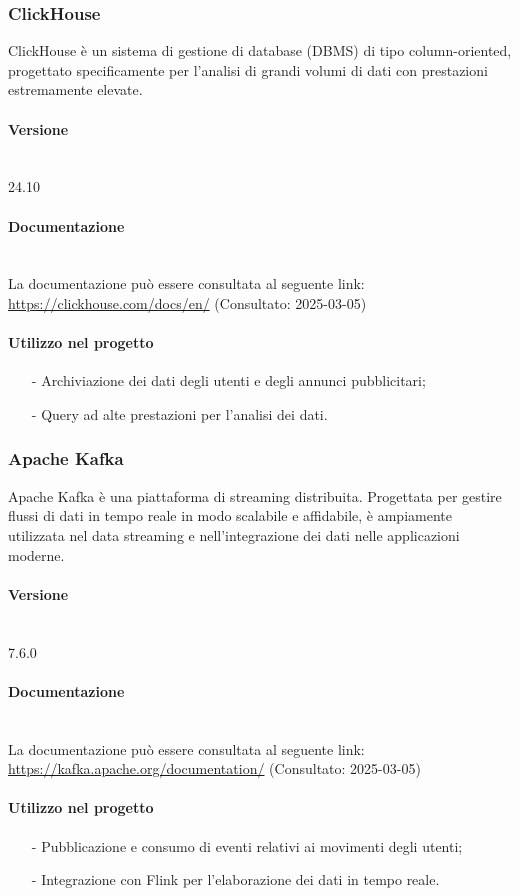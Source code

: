 \documentclass[10pt]{article}
\newcommand{\myparagraph}[1]{\paragraph{#1}\mbox{}\\\vspace{0.4em}}
\begin{document}
\begin{justify}
    \subsubsection{ClickHouse}
    ClickHouse è un sistema di gestione di database (DBMS) di tipo column-oriented, progettato specificamente per l'analisi di grandi volumi di dati con prestazioni estremamente elevate.

    \myparagraph{Versione} 
    24.10 %

    \myparagraph{Documentazione}
    La documentazione può essere consultata al seguente link: \textcolor{blue}{\url{https://clickhouse.com/docs/en/}} (Consultato: 2025-03-05)
    
    \paragraph{Utilizzo nel progetto}
    \begin{itemize}
        \item[-] Archiviazione dei dati degli utenti e degli annunci pubblicitari;
        \item[-] Query ad alte prestazioni per l'analisi dei dati.
    \end{itemize}

    \subsubsection{Apache Kafka}
    Apache Kafka è una piattaforma di streaming distribuita. Progettata per gestire flussi di dati in tempo reale in modo scalabile e affidabile, è ampiamente utilizzata nel data streaming e nell’integrazione dei dati nelle applicazioni moderne.
    
    \myparagraph{Versione} 
    7.6.0 
    
    \myparagraph{Documentazione} 
    La documentazione può essere consultata al seguente link: \textcolor{blue}{\url{https://kafka.apache.org/documentation/}} (Consultato: 2025-03-05)
    
    \paragraph{Utilizzo nel progetto}
    \begin{itemize}
        \item[-] Pubblicazione e consumo di eventi relativi ai movimenti degli utenti;
        \item[-] Integrazione con Flink per l'elaborazione dei dati in tempo reale.
    \end{itemize}


\end{justify}
\end{document}
